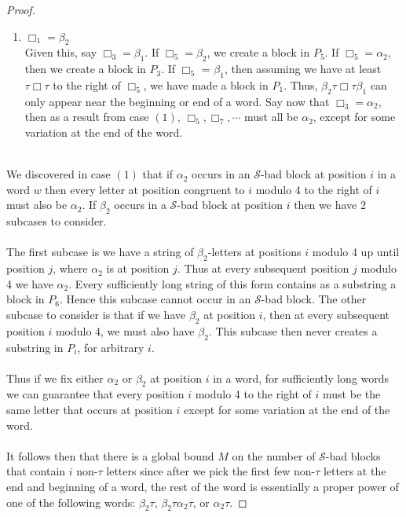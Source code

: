 \documentclass[11pt]{amsart}
\theoremstyle{definition}
\theoremstyle{remark}
\numberwithin{equation}{section}
\begin{document}
\begin{proof}
\begin{enumerate}
\item $\Box_{1} = \beta_{2}$ \\
Given this, say $\Box_{3} = \beta_{1}$. If $\Box_{5} = \beta_{2}$, we create a block in $P_{5}$. If $\Box_{5} = \alpha_{2}$, then we create a block in $P_{3}$. If $\Box_{5}$ = $\beta_{1}$, then assuming we have at least $\tau \Box \tau$ to the right of $\Box_{5}$, we have made a block in $P_{1}$. Thus, $\beta_{2} \tau \Box \tau \beta_{1}$ can only appear near the beginning or end of a word. Say now that $\Box_{3} = \alpha_{2}$, then as a result from case $(1)$, $\Box_{5}, \Box_{7}, \cdots$ must all be $\alpha_{2}$, except for some variation at the end of the word. \\ \\
\end{enumerate}
We discovered in case $(1)$ that if $\alpha_{2}$ occurs in an $\mathcal{S}$-bad block at position $i$ in a word $w$ then every letter at position congruent to $i$ modulo 4 to the right of $i$ must also be $\alpha_{2}$. If $\beta_{2}$ occurs in a $\mathcal{S}$-bad block at position $i$ then we have 2 subcases to consider. \\ \\
The first subcase is we have a string of $\beta_{2}$-letters at positions $i$ modulo 4 up until position $j$, where $\alpha_{2}$ is at position $j$. Thus at every subsequent position $j$ modulo 4 we have $\alpha_{2}$. Every sufficiently long string of this form contains as a substring a block in $P_{6}$. Hence this subcase cannot occur in an $\mathcal{S}$-bad block. The other subcase to consider is that if we have $\beta_{2}$ at position $i$, then at every subsequent position $i$ modulo 4, we must also have $\beta_{2}$. This subcase then never creates a substring in $P_{i}$, for arbitrary $i$.  \\ \\
Thus if we fix either $\alpha_{2}$ or $\beta_{2}$ at position $i$ in a word, for sufficiently long words we can guarantee that every position $i$ modulo 4 to the right of $i$ must be the same letter that occurs at position $i$ except for some variation at the end of the word. \\ \\
It follows then that there is a global bound $M$ on the number of $\mathcal{S}$-bad blocks that contain $i$ non-$\tau$ letters since after we pick the first few non-$\tau$ letters at the end and beginning of a word, the rest of the word is essentially a proper power of one of the following words: $\beta_{2} \tau$, $\beta_{2} \tau \alpha_{2} \tau$, or $\alpha_{2} \tau$. 
\end{proof}
\end{document}
